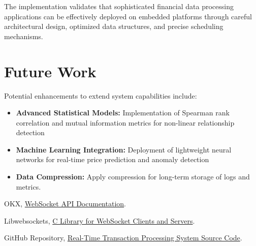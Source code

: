 \documentclass[12pt,a4paper]{article}
\begin{document}
The implementation validates that sophisticated financial data processing applications can be effectively deployed on embedded platforms through careful architectural design, optimized data structures, and precise scheduling mechanisms.


\section{Future Work}

Potential enhancements to extend system capabilities include:
\begin{itemize}
    \item \textbf{Advanced Statistical Models:} Implementation of Spearman rank correlation and mutual information metrics for non-linear relationship detection
    \item \textbf{Machine Learning Integration:} Deployment of lightweight neural networks for real-time price prediction and anomaly detection
    \item \textbf{Data Compression:} Apply compression for long-term storage of logs and metrics.
\end{itemize}

\begin{thebibliography}{3}
    OKX, \href{https://www.okx.com/docs-v5/en/#websocket-api-public-channel}{WebSocket API Documentation}.
    
    Libwebsockets, \href{https://libwebsockets.org/}{C Library for WebSocket Clients and Servers}.
    
    GitHub Repository, \href{https://github.com/fraidakis/realtime-embedded-crypto-processor}{Real-Time Transaction Processing System Source Code}.
\end{thebibliography}

\newpage

\end{document}
